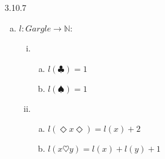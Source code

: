 \begin{itemize}
\item[3.10.7]
\begin{enumerate}[(a)]
    \item 
    $l: Gargle \rightarrow \mathbb{N}$:\begin{enumerate}[(i)]
        \item \begin{enumerate}[(a)]
            \item $l(\clubsuit) = 1$
        \item $l(\spadesuit) = 1$
        \end{enumerate}
        \item \begin{enumerate}[(a)]
            \item $l(\Diamond x\Diamond)= l(x) + 2$
            \item $l(x\heartsuit y)= l(x)+l(y)+1 $
        \end{enumerate}
    \end{enumerate}



\end{enumerate}
\end{itemize}

